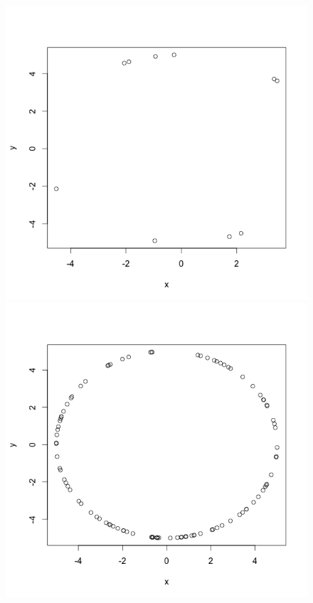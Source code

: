 \documentclass[a4paper]{article}
\begin{document}
\begin{figure}[!htb]
  \includegraphics[width=\linewidth]{circle10.png}
\endminipage\hfill
{}
  \includegraphics[width=\linewidth]{circle100.png}

\end{figure}
\end{document}
